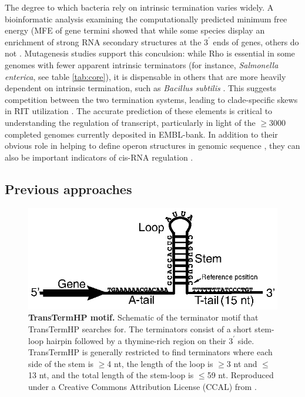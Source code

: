 The degree to which bacteria rely on intrinsic termination varies widely. A bioinformatic analysis examining the computationally predicted minimum free energy (MFE of gene termini showed that while some species display an enrichment of strong RNA secondary structures at the $3^\prime$ ends of genes, others do not \parencite{Washio1998}. Mutagenesis studies support this conculsion: while Rho is essential in some genomes with fewer apparent intrinsic terminators (for instance, \textit{Salmonella enterica}, see table \ref{tab:core}), it is dispensable in others that are more heavily dependent on intrinsic termination, such as \textit{Bacillus subtilis} \parencite{Quirk1993}. This suggests competition between the two termination systems, leading to clade-specific skews in RIT utilization \parencite{Carafa1990, Kroger1998, Hoon2005}. The accurate prediction of these elements is critical to understanding the regulation of transcript, particularly in light of the $\ge$3000 completed genomes currently deposited in EMBL-bank. In addition to their obvious role in helping to define operon structures in genomic sequence \parencite{Salgado2013}, they can also be important indicators of cis-RNA regulation \parencite{Henkin2002, Barrick2007, Naville2010}.

\subsection{Previous approaches}



\begin{figure}[htp]
\begin{center}
\includegraphics[width=14cm]{transterm}
\caption[TransTermHP motif]{\textbf{TransTermHP motif.} Schematic of the terminator motif that TransTermHP searches for. The terminators consist of a short stem-loop hairpin followed by a thymine-rich region on their $3^\prime$ side. TransTermHP is generally restricted to find terminators where each side of the stem is $\ge$4 nt, the length of the loop is $\ge$3 nt and $\le$13 nt, and the total length of the stem-loop is $\le$59 nt. Reproduced under a Creative Commons Attribution License (CCAL) from \textcite{Kingsford2007}.
} 
\label{fig:transterm}
\end{center}
\end{figure}
